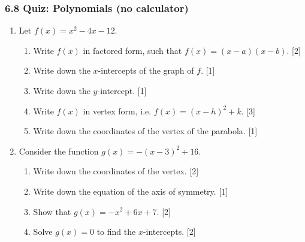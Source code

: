 \documentclass[12pt, twoside]{article}
\begin{document}
\subsubsection*{6.8 Quiz: Polynomials (no calculator)}

\begin{enumerate}[itemsep=0.15cm]

\item[1.] [Maximum mark: 8]

Let $f(x) = x^2 - 4x - 12$.

\begin{enumerate}[itemsep=0.15cm]
  \item Write $f(x)$ in factored form, such that $f(x) = (x - a)(x - b)$. \hfill [2]
  \item Write down the $x$-intercepts of the graph of $f$. \hfill [1]
  \item Write down the $y$-intercept. \hfill [1]
  \item Write $f(x)$ in vertex form, i.e. $f(x) = (x - h)^2 + k$. \hfill [3]
  \item Write down the coordinates of the vertex of the parabola. \hfill [1]
\end{enumerate}


\newpage

\item[2.] [Maximum mark: 7]

Consider the function $g(x) = -(x - 3)^2 + 16$.

\begin{enumerate}[itemsep=0.15cm]
  \item Write down the coordinates of the vertex. \hfill [2]
  \item Write down the equation of the axis of symmetry. \hfill [1]
  \item Show that $g(x) = -x^2 + 6x + 7$. \hfill [2]
  \item Solve $g(x) = 0$ to find the $x$-intercepts. \hfill [2]
\end{enumerate}



\end{enumerate}
\end{document}
